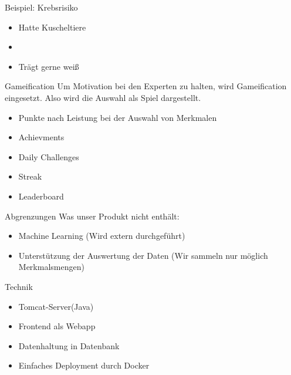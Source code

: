 \documentclass[xcolor=dvipsnames]{beamer}
\begin{document}
    \begin{frame}{Beispiel: Krebsrisiko}
        \begin{itemize}
            \item Hatte Kuscheltiere
            \item {}
            \item Trägt gerne weiß
        \end{itemize}
    \end{frame}
    \begin{frame}{Gameification}
    Um Motivation bei den Experten zu halten, wird Gameification eingesetzt. Also wird die Auswahl als Spiel dargestellt.
        \begin{itemize}
            \item Punkte nach Leistung bei der Auswahl von Merkmalen
            \item Achievments
            \item Daily Challenges
            \item Streak
            \item Leaderboard
        \end{itemize}
    \end{frame}
    \begin{frame}{Abgrenzungen}
        Was unser Produkt nicht enthält:
        \begin{itemize}
            \item Machine Learning (Wird extern durchgeführt)
            \item Unterstützung der Auswertung der Daten (Wir sammeln nur möglich Merkmalsmengen)
        \end{itemize}
    \end{frame}
    \begin{frame}{Technik}
        \begin{itemize}
            \item Tomcat-Server(Java)
            \item Frontend als Webapp
            \item Datenhaltung in Datenbank
            \item Einfaches Deployment durch Docker
        \end{itemize}
    \end{frame}
\end{document}
